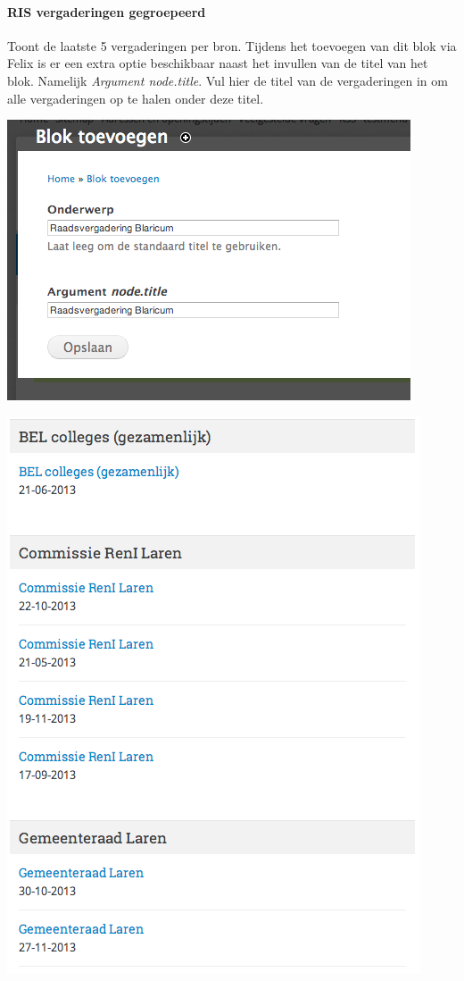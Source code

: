\paragraph{RIS vergaderingen gegroepeerd}

Toont de laatste 5 vergaderingen per bron. Tijdens het toevoegen van dit blok via Felix is er een extra optie beschikbaar naast het invullen van de titel van het blok. Namelijk \emph{Argument node.title}. Vul hier de titel van de vergaderingen in om alle vergaderingen op te halen onder deze titel. 

\begin{center}
	\includegraphics[scale=0.5]{img/blokken/ibabs3.png}
\end{center}

\begin{center}
	\includegraphics[scale=0.5]{img/blokken/ibabs2.png}
\end{center}

